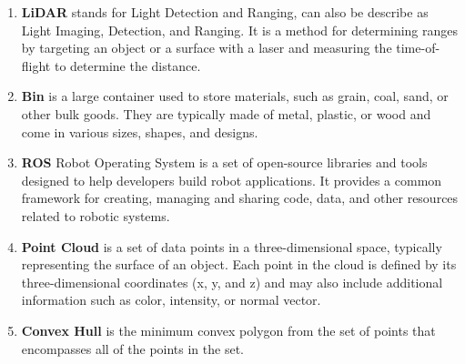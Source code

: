 \begin{enumerate}
	\item \textbf{LiDAR} \textemdash stands for Light Detection and Ranging, can also be describe as Light Imaging, Detection, and Ranging. It is a method for determining ranges by targeting an object or a surface with a laser and measuring the time-of-flight to determine the distance.

	\item \textbf{Bin} \textemdash is a large container used to store materials, such as grain, coal, sand, or other bulk goods. They are typically made of metal, plastic, or wood and come in various sizes, shapes, and designs.

	\item \textbf{ROS} \textemdash Robot Operating System is a set of open-source libraries and tools designed to help developers build robot applications. It provides a common framework for creating, managing and sharing code, data, and other resources related to robotic systems.

	\item \textbf{Point Cloud} \textemdash is a set of data points in a three-dimensional space, typically representing the surface of an object. Each point in the cloud is defined by its three-dimensional coordinates (x, y, and z) and may also include additional information such as color, intensity, or normal vector.
	\item \textbf{Convex Hull} \textemdash is the minimum convex polygon from the set of points that encompasses all of the points in the set.

\end{enumerate}
